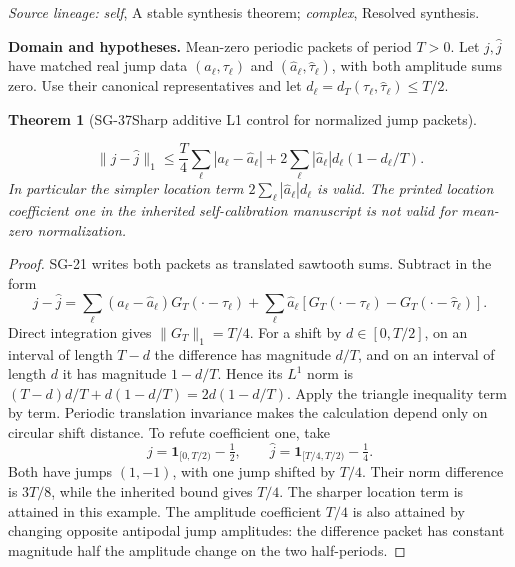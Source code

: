 \documentclass[11pt]{article}
\newtheorem{theorem}{Theorem}[section]
\theoremstyle{definition}\newtheorem{definition}[theorem]{Definition}
\theoremstyle{remark}\newtheorem{remark}[theorem]{Remark}
\begin{document}
\par{\small\color{Teal}\textit{Source lineage:} \textit{self}, A stable synthesis theorem; \textit{complex}, Resolved synthesis.}\par

\par{\small\textbf{Domain and hypotheses.} Mean-zero periodic packets of period $T>0$. Let $j,\widehat j$ have matched real jump data $(a_\ell,\tau_\ell)$ and $(\widehat a_\ell,\widehat\tau_\ell)$, with both amplitude sums zero. Use their canonical representatives and let $d_\ell=d_T(\tau_\ell,\widehat\tau_\ell)\le T/2$.}\par
\begin{theorem}[SG-37\quad Sharp additive L1 control for normalized jump packets]\label{SG-37}

\[
 \|j-\widehat j\|_1
 \le\frac T4\sum_\ell|a_\ell-\widehat a_\ell|
 +2\sum_\ell|\widehat a_\ell|d_\ell(1-d_\ell/T).
\]
In particular the simpler location term $2\sum_\ell|\widehat a_\ell|d_\ell$
is valid. The printed location coefficient one in the inherited
self-calibration manuscript is not valid for mean-zero normalization.

\end{theorem}
\begin{proof}

SG-21 writes both packets as translated sawtooth sums. Subtract in the form
\[
 j-\widehat j=
 \sum_\ell(a_\ell-\widehat a_\ell)G_T(\cdot-\tau_\ell)
 +\sum_\ell\widehat a_\ell
 [G_T(\cdot-\tau_\ell)-G_T(\cdot-\widehat\tau_\ell)].
\]
Direct integration gives $\|G_T\|_1=T/4$.
For a shift by $d\in[0,T/2]$, on an interval of length $T-d$ the difference
has magnitude $d/T$, and on an interval of length $d$ it has magnitude
$1-d/T$. Hence its $L^1$ norm is
$(T-d)d/T+d(1-d/T)=2d(1-d/T)$.
Apply the triangle inequality term by term. Periodic translation invariance
makes the calculation depend only on circular shift distance.
To refute coefficient one, take
\[
 j=\mathbf1_{[0,T/2)}-\tfrac12,\qquad
 \widehat j=\mathbf1_{[T/4,T/2)}-\tfrac14.
\]
Both have jumps $(1,-1)$, with one jump shifted by $T/4$. Their norm
difference is $3T/8$, while the inherited bound gives $T/4$.
The sharper location term is attained in this example. The amplitude
coefficient $T/4$ is also attained by changing opposite antipodal jump
amplitudes: the difference packet has constant magnitude half the amplitude
change on the two half-periods.

\end{proof}
\end{document}
